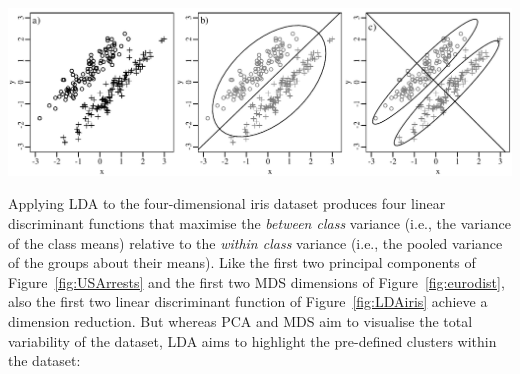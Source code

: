 \noindent\includegraphics[width=\linewidth]{../figures/PCAvsLDA.pdf}
\begingroup {}
\label{fig:PCAvsLDA}
\endgroup

Applying LDA to the four-dimensional iris dataset produces four linear
discriminant functions that maximise the \textit{between class}
variance (i.e., the variance of the class means) relative to the
\textit{within class} variance (i.e., the pooled variance of the
groups about their means). Like the first two principal components of
Figure~\ref{fig:USArrests} and the first two MDS dimensions of
Figure~\ref{fig:eurodist}, also the first two linear discriminant
function of Figure~\ref{fig:LDAiris} achieve a dimension
reduction. But whereas PCA and MDS aim to visualise the total
variability of the dataset, LDA aims to highlight the pre-defined
clusters within the dataset:

